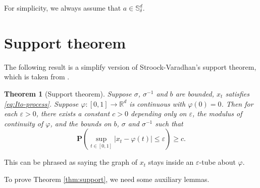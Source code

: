 \documentclass[twoside, 12pt]{book}
\numberwithin{equation}{chapter}
\newtheorem{theorem}{Theorem}[section]
\def\mR{{\mathbb R}}
\def\mS{{\mathbb S}}
\def\bP{{\mathbf P}}
\def\l{\left}
\def\r{\right}
\def\geq{\geqslant}
\def\leq{\leqslant}
\def\eps{\varepsilon}
\begin{document}
	For simplicity,  we always assume that $a\in \mS^d_{\delta}$. 
	
	\section{Support theorem} 
	The following result is a simplify version of Stroock-Varadhan's support theorem, which is taken from \cite{bass1998diffusions}. 
	\begin{theorem}[Support theorem]
		Suppose $\sigma$, $\sigma^{-1}$ and $b$ are bounded, $x_t$ satisfies \eqref{eq:Ito-process}. Suppose $\varphi: [0,1]\to \mR^d$ is continuous with $\varphi(0)=0$. Then for each $\eps>0$, there exists a constant $c>0$ depending only on $\eps$, the modulus of continuity of $\varphi$, and the bounds on $b$, $\sigma$ and $\sigma^{-1}$ such that 
		\begin{equation}\label{Eq-support}
			\bP\l(\sup_{t\in [0,1]}|x_t-\varphi(t)|\leq \eps\r)\geq c. 
		\end{equation}
	\end{theorem}\label{thm:support}
	This can be phrased as saying the graph of $x_t$ stays inside an $\eps$-tube about $\varphi$. 
	
	To prove Theorem \ref{thm:support}, we need some  auxiliary lemmas. 
	
\end{document}

